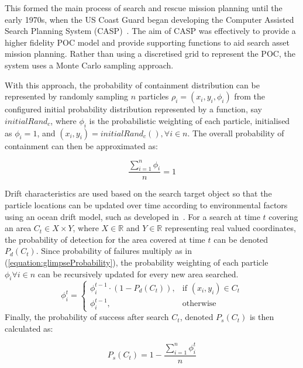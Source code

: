 \documentclass[10pt,a4paper, oneside, conference]{IEEEtran}
\begin{document}
	This formed the main process of search and rescue mission planning until the early 1970s, when the US Coast Guard began developing the Computer Assisted Search Planning System (CASP)~\cite{Richardson1980}.
	The aim of CASP was effectively to provide a higher fidelity POC model and provide supporting functions to aid search asset mission planning. 
	Rather than using a discretised grid to represent the POC, the system uses a Monte Carlo sampling approach. 
	
	With this approach, the probability of containment distribution can be represented by randomly sampling $n$ particles $\rho_i=(x_i,y_i,\phi_i)$ from the configured initial probability distribution represented by a function, say $initialRand_c$, where $\phi_i$ is the probabilistic weighting of each particle, initialised as $\phi_i=1$, and $(x_i,y_i)=initialRand_c(),\forall i\in n$.
	The overall probability of containment can then be approximated as:
	
	\begin{equation}
	\label{equation:monteCarloPOC}
	\frac{\sum_{i=1}^{n}{\phi_i}}{n}=1
	\end{equation}	  
	
	Drift characteristics are used based on the search target object so that the particle locations can be updated over time according to environmental factors using an ocean drift model, such as developed in~\cite{Allen2006}.
	For a search at time $t$ covering an area $C_t \in X \times Y$, where $X \in \mathbb{R}$ and $Y \in \mathbb{R}$ representing real valued coordinates, the probability of detection for the area covered at time $t$ can be denoted $P_d(C_t)$. Since probability of failures multiply as in (\ref{equation:glimpseProbability}), the probability weighting of each particle $\phi_i \forall i\in n$ can be recursively updated for every new area searched.
	$$
	\phi_i^t=
	\begin{cases}
	\phi_i^{t-1}\cdot (1-P_d(C_t)), & \text{if } (x_i,y_i) \in C_t\\
	\phi_i^{t-1}, & \text{otherwise}
	\end{cases}
	$$
	Finally, the probability of success after search $C_t$, denoted $P_s(C_t)$ is then calculated as:
	
	\begin{equation}
	\label{equation:monteCarloPOS}
	P_s(C_t)=1-\frac{\sum_{i=1}^{n}{\phi_i^t}}{n}
	\end{equation}
	
\end{document}
